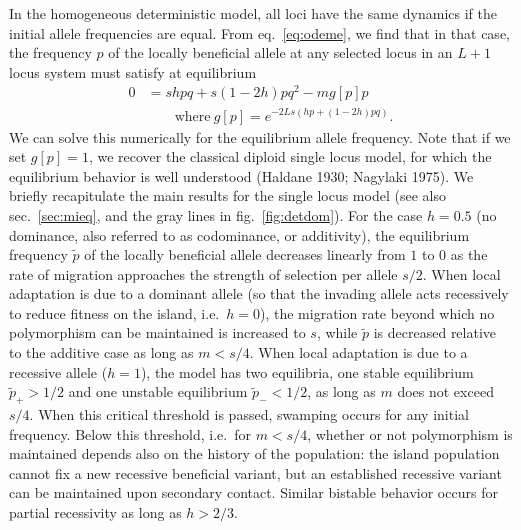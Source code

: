 \documentclass[
  11pt,
]{article}
\begin{document}
In the homogeneous deterministic model, all loci have the same dynamics
if the initial allele frequencies are equal. From eq.~\ref{eq:odeme}, we
find that in that case, the frequency \(p\) of the locally beneficial
allele at any selected locus in an \(L+1\) locus system must satisfy at
equilibrium \begin{align}
   0 &= shpq + s(1-2h)pq^2 -mg[p]p 
   \label{eq:odeq} \\
   &\qquad\text{where}\ g[p] = e^{-2Ls(hp + (1-2h)pq)}. \nonumber
\end{align} We can solve this numerically for the equilibrium allele
frequency. Note that if we set \(g[p] = 1\), we recover the classical
diploid single locus model, for which the equilibrium behavior is well
understood (Haldane 1930; Nagylaki 1975). We briefly recapitulate the
main results for the single locus model (see also sec.~\ref{sec:mieq},
and the gray lines in fig.~\ref{fig:detdom}). For the case \(h=0.5\) (no
dominance, also referred to as codominance, or additivity), the
equilibrium frequency \(\tilde{p}\) of the locally beneficial allele
decreases linearly from \(1\) to \(0\) as the rate of migration
approaches the strength of selection per allele \(s/2\). When local
adaptation is due to a dominant allele (so that the invading allele acts
recessively to reduce fitness on the island, i.e.~\(h=0\)), the
migration rate beyond which no polymorphism can be maintained is
increased to \(s\), while \(\tilde{p}\) is decreased relative to the
additive case as long as \(m < s/4\). When local adaptation is due to a
recessive allele (\(h=1\)), the model has two equilibria, one stable
equilibrium \(\tilde{p}_+ > 1/2\) and one unstable equilibrium
\(\tilde{p}_- < 1/2\), as long as \(m\) does not exceed \(s/4\). When
this critical threshold is passed, swamping occurs for any initial
frequency. Below this threshold, i.e.~for \(m<s/4\), whether or not
polymorphism is maintained depends also on the history of the
population: the island population cannot fix a new recessive beneficial
variant, but an established recessive variant can be maintained upon
secondary contact. Similar bistable behavior occurs for partial
recessivity as long as \(h > 2/3\).
\end{document}

